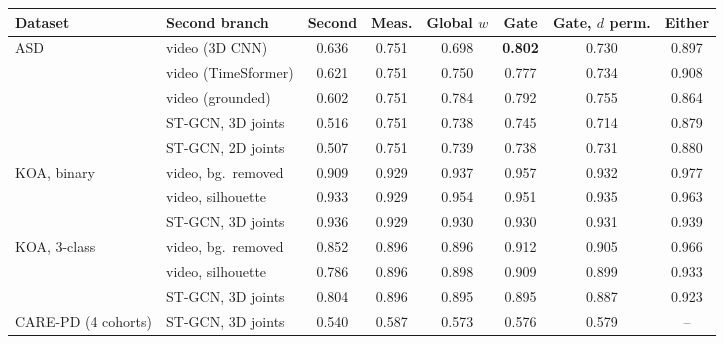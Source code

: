 \begin{tabular}{@{}llcccccc@{}}
\toprule
Dataset & Second branch & Second & Meas. & Global $w$ & Gate & Gate, $d$ perm. & Either \\
\midrule
ASD & video (3D CNN) & 0.636 & 0.751 & 0.698 & \textbf{0.802} & 0.730 & 0.897 \\
 & video (TimeSformer) & 0.621 & 0.751 & 0.750 & 0.777 & 0.734 & 0.908 \\
 & video (grounded) & 0.602 & 0.751 & 0.784 & 0.792 & 0.755 & 0.864 \\
 & ST-GCN, 3D joints & 0.516 & 0.751 & 0.738 & 0.745 & 0.714 & 0.879 \\
 & ST-GCN, 2D joints & 0.507 & 0.751 & 0.739 & 0.738 & 0.731 & 0.880 \\
\midrule
KOA, binary & video, bg.\ removed & 0.909 & 0.929 & 0.937 & 0.957 & 0.932 & 0.977 \\
 & video, silhouette & 0.933 & 0.929 & 0.954 & 0.951 & 0.935 & 0.963 \\
 & ST-GCN, 3D joints & 0.936 & 0.929 & 0.930 & 0.930 & 0.931 & 0.939 \\
\midrule
KOA, 3-class & video, bg.\ removed & 0.852 & 0.896 & 0.896 & 0.912 & 0.905 & 0.966 \\
 & video, silhouette & 0.786 & 0.896 & 0.898 & 0.909 & 0.899 & 0.933 \\
 & ST-GCN, 3D joints & 0.804 & 0.896 & 0.895 & 0.895 & 0.887 & 0.923 \\
\midrule
CARE-PD (4 cohorts) & ST-GCN, 3D joints & 0.540 & 0.587 & 0.573 & 0.576 & 0.579 & -- \\
\bottomrule
\end{tabular}
